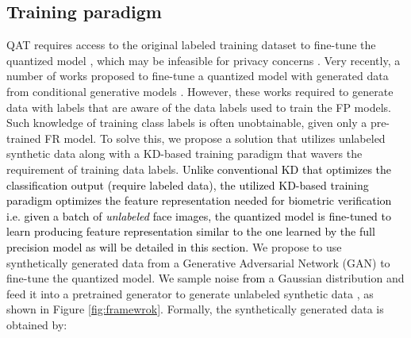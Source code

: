 \documentclass[a4paper,conference]{IEEEtran}
\begin{document}
\subsection{Training paradigm}
\vspace{-1mm}
QAT requires access to the original labeled training dataset to fine-tune the quantized model \cite{DBLP:conf/cvpr/JacobKCZTHAK18}, which may be infeasible for privacy concerns \cite{DBLP:conf/cvpr/ChoiCEL20}. 
Very recently, a number of works proposed to fine-tune a quantized model with generated data from conditional generative models \cite{jacob2018quantization,DBLP:conf/eccv/XuLZLCLT20}. 
However, these works \cite{jacob2018quantization,DBLP:conf/eccv/XuLZLCLT20} required to generate data with labels that are aware of the data labels used to train the FP models. 
Such knowledge of training class labels is often unobtainable, given only a pre-trained FR model.
To solve this, we propose a solution that utilizes unlabeled synthetic data along with a KD-based training paradigm that wavers the requirement of training data labels. 
\textcolor{black}{
Unlike conventional KD \cite{DBLP:journals/corr/HintonVD15} that optimizes the classification output (require labeled data), the utilized KD-based training paradigm optimizes the feature representation needed for biometric verification i.e. given a batch of \textit{unlabeled} face images, the quantized model is fine-tuned to learn producing feature representation similar to the one learned by the full precision model 
as will be detailed in this section. }
We propose to use synthetically generated data from a Generative Adversarial Network (GAN) \cite{gan,DBLP:conf/nips/KarrasAHLLA20} to fine-tune the quantized model.
We sample noise  \textcolor{black}{from} a Gaussian distribution  and feed it into a pretrained generator  to generate unlabeled synthetic data , as shown in Figure \ref{fig:framewrok}. Formally, the synthetically generated data is obtained by:
\vspace{-1mm}
\end{document}
